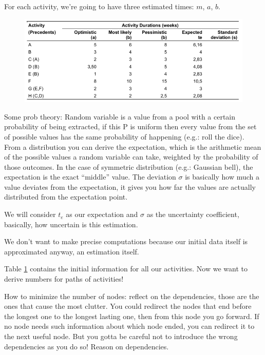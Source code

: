 \noindent For each activity, we're going to have three estimated times: $m$, $a$, $b$.

\begin{figure} [H]
    \centering
    \includegraphics[width=0.75\linewidth]{Figures//04/pert00.png}
    \label{fig:pert_table}
\end{figure}

\noindent Some prob theory: Random variable is a value from a pool with a certain probability of being extracted, if this P is uniform then every value from the set of possible values has the same probability of happening (e.g.: roll the dice). From a distribution you can derive the expectation, which is the arithmetic mean of the possible values a random variable can take, weighted by the probability of those outcomes. In the case of symmetric distribution (e.g.: Gaussian bell), the expectation is the exact ``middle'' value. The deviation $\sigma$ is basically how much a value deviates from the expectation, it gives you how far the values are actually distributed from the expectation point.

\noindent We will consider $t_e$ as our expectation and $\sigma$ as the uncertainty coefficient, basically, how uncertain is this estimation.

\noindent We don't want to make precise computations because our initial data itself is approximated anyway, an estimation itself.

\noindent Table \ref{fig:pert_table} contains the initial information for all our activities. Now we want to derive numbers for paths of activities!


\noindent How to minimize the number of nodes: reflect on the dependencies, those are the ones that cause the most clutter. You could redirect the nodes that end before the longest one to the longest lasting one, then from this node you go forward. If no node needs such information about which node ended, you can redirect it to the next useful node. But you gotta be careful not to introduce the wrong dependencies as you do so! Reason on dependencies.

